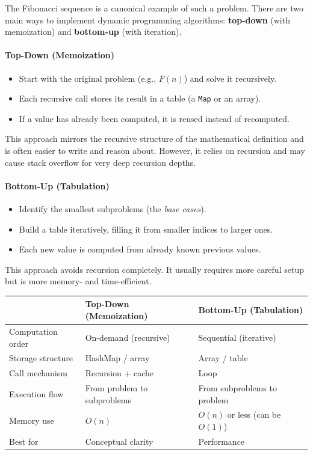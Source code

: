 \documentclass{article}
\begin{document}
The Fibonacci sequence is a canonical example of such a problem.
There are two main ways to implement dynamic programming algorithms:
\textbf{top-down} (with memoization) and \textbf{bottom-up} (with iteration).
\paragraph{Top-Down (Memoization)}
\begin{itemize}
	\item Start with the original problem (e.g., $F(n)$) and solve it recursively.
	\item Each recursive call stores its result in a table (a \texttt{Map} or an array).
	\item If a value has already been computed, it is reused instead of recomputed.
\end{itemize}
This approach mirrors the recursive structure of the mathematical definition and is often easier to write and reason about.
However, it relies on recursion and may cause stack overflow for very deep recursion depths.

\paragraph{Bottom-Up (Tabulation)}
\begin{itemize}
	\item Identify the smallest subproblems (the \emph{base cases}).
	\item Build a table iteratively, filling it from smaller indices to larger ones.
	\item Each new value is computed from already known previous values.
\end{itemize}
This approach avoids recursion completely.
It usually requires more careful setup but is more memory- and time-efficient.

\begin{center}
	\begin{tabular}{lll}
		\toprule
		& \textbf{Top-Down (Memoization)} & \textbf{Bottom-Up (Tabulation)} \\
		\midrule
		Computation order & On-demand (recursive) & Sequential (iterative) \\
		Storage structure & HashMap / array & Array / table \\
		Call mechanism & Recursion + cache & Loop \\
		Execution flow & From problem to subproblems & From subproblems to problem \\
		Memory use & $O(n)$ & $O(n)$ or less (can be $O(1)$) \\
		Best for & Conceptual clarity & Performance \\
		\bottomrule
	\end{tabular}
\end{center}
\end{document}

